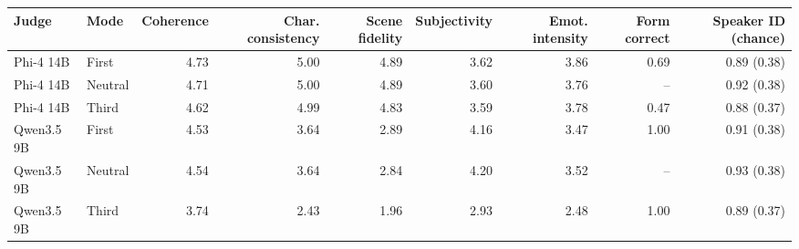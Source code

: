 \begin{tabular}{llrrrrrrr}
\toprule
Judge & Mode & Coherence & Char. consistency & Scene fidelity & Subjectivity & Emot. intensity & Form correct & Speaker ID (chance) \\
\midrule
Phi-4 14B & First & 4.73 & 5.00 & 4.89 & 3.62 & 3.86 & 0.69 & 0.89 (0.38) \\
Phi-4 14B & Neutral & 4.71 & 5.00 & 4.89 & 3.60 & 3.76 & -- & 0.92 (0.38) \\
Phi-4 14B & Third & 4.62 & 4.99 & 4.83 & 3.59 & 3.78 & 0.47 & 0.88 (0.37) \\
Qwen3.5 9B & First & 4.53 & 3.64 & 2.89 & 4.16 & 3.47 & 1.00 & 0.91 (0.38) \\
Qwen3.5 9B & Neutral & 4.54 & 3.64 & 2.84 & 4.20 & 3.52 & -- & 0.93 (0.38) \\
Qwen3.5 9B & Third & 3.74 & 2.43 & 1.96 & 2.93 & 2.48 & 1.00 & 0.89 (0.37) \\
\bottomrule
\end{tabular}
